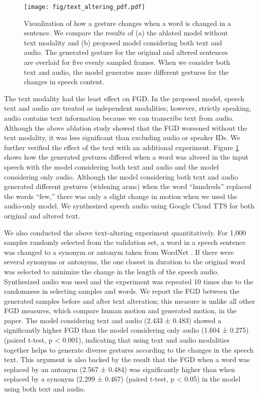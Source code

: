 \documentclass[acmtog]{acmart}
\begin{document}
\begin{figure}
  \centering
  \texttt{[image: fig/text\_altering\_pdf.pdf]}
  \caption{Visualization of how a gesture changes when a word is changed in a sentence. We compare the results of (a) the ablated model without text modality and (b) proposed model considering both text and audio. The generated gesture for the original and altered sentences are overlaid for five evenly sampled frames. When we consider both text and audio, the model generates more different gestures for the changes in speech content.}
  \label{fig:text_altering}
\end{figure} 
The text modality had the least effect on FGD. In the proposed model, speech text and audio are treated as independent modalities; however, strictly speaking, audio contains text information because we can transcribe text from audio. Although the above ablation study showed that the FGD worsened without the text modality, it was less significant than excluding audio or speaker IDs. We further verified the effect of the text with an additional experiment. Figure \ref{fig:text_altering} shows how the generated gestures differed when a word was altered in the input speech with the model considering both text and audio and the model considering only audio. Although the model considering both text and audio generated different gestures (widening arms) when the word ``hundreds'' replaced the words ``few,'' there was only a slight change in motion when we used the audio-only model. We synthesized speech audio using Google Cloud TTS \cite{googletts} for both original and altered text.

We also conducted the above text-altering experiment quantitatively. For 1,000 samples randomly selected from the validation set, a word in a speech sentence was changed to a synonym or antonym taken from WordNet \cite{miller1995wordnet}. If there were several synonyms or antonyms, the one closest in duration to the original word was selected to minimize the change in the length of the speech audio. Synthesized audio was used and the experiment was repeated 10 times due to the randomness in selecting samples and words. We report the FGD between the generated samples before and after text alteration; this measure is unlike all other FGD measures, which compare human motion and generated motion, in the paper. The model considering text and audio (2.433 ± 0.483) showed a significantly higher FGD than the model considering only audio (1.604 ± 0.275) (paired t-test, p < 0.001), indicating that using text and audio modalities together helps to generate diverse gestures according to the changes in the speech text. This argument is also backed by the result that the FGD when a word was replaced by an antonym (2.567 ± 0.484) was significantly higher than when replaced by a synonym (2.299 ± 0.467) (paired t-test, p < 0.05) in the model using both text and audio.
\end{document}
